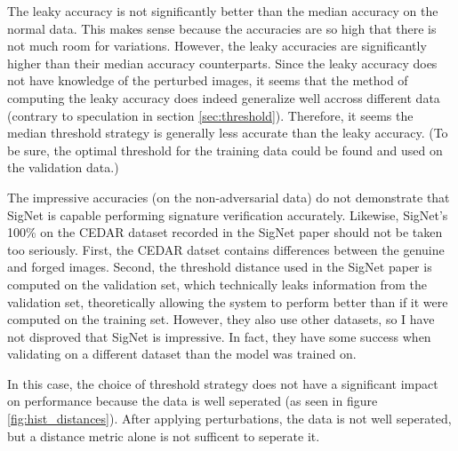 The leaky accuracy is not significantly better than the median accuracy on the normal data.
This makes sense because the accuracies are so high that there is not much room for variations.
However, the leaky accuracies are significantly higher than their median accuracy counterparts.
Since the leaky accuracy does not have knowledge of the perturbed images, it seems that the method of computing the leaky accuracy does indeed generalize well accross different data (contrary to speculation in section \ref{sec:threshold}).
Therefore, it seems the median threshold strategy is generally less accurate than the leaky accuracy.
(To be sure, the optimal threshold for the training data could be found and used on the validation data.)

The impressive accuracies (on the non-adversarial data) do not demonstrate that SigNet is capable performing signature verification accurately.
Likewise, SigNet's 100\% on the CEDAR dataset recorded in the SigNet paper should not be taken too seriously.
First, the CEDAR datset contains differences between the genuine and forged images.
Second, the threshold distance used in the SigNet paper is computed on the validation set, which technically leaks information from the validation set, theoretically allowing the system to perform better than if it were computed on the training set.
However, they also use other datasets, so I have not disproved that SigNet is impressive.
In fact, they have some success when validating on a different dataset than the model was trained on\cite{sig_net}.

In this case, the choice of threshold strategy does not have a significant impact on performance because the data is well seperated (as seen in figure \ref{fig:hist_distances}).
After applying perturbations, the data is not well seperated, but a distance metric alone is not sufficent to seperate it.


